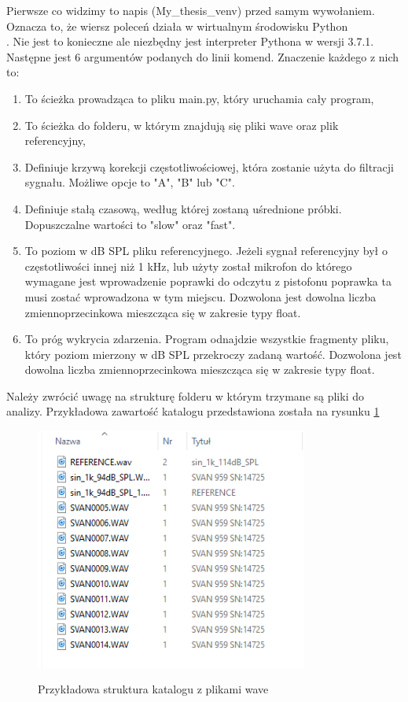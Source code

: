 \documentclass[eng,printmode]{mgr}
\begin{document}
Pierwsze co widzimy to napis (My\_thesis\_venv) przed samym wywołaniem. Oznacza to, że wiersz poleceń działa w wirtualnym środowisku Python \\ \cite{venv}. Nie jest to konieczne ale niezbędny jest interpreter Pythona w wersji 3.7.1. Następne jest 6 argumentów podanych do linii komend. Znaczenie każdego z nich to:

\begin{minipage}{\linewidth}
\begin{enumerate}
\item To ścieżka prowadząca to pliku main.py, który uruchamia cały program,
\item To ścieżka do folderu, w którym znajdują się pliki wave oraz plik referencyjny,
\item Definiuje krzywą korekcji częstotliwościowej, która zostanie użyta do filtracji sygnału. Możliwe opcje to "A", "B" lub "C".
\item Definiuje stałą czasową, według której zostaną uśrednione próbki. Dopuszczalne wartości to "slow" oraz "fast".
\item To poziom w dB SPL pliku referencyjnego. Jeżeli sygnał referencyjny był o częstotliwości innej niż 1 kHz, lub użyty został mikrofon do którego wymagane jest wprowadzenie poprawki do odczytu z pistofonu poprawka ta musi zostać wprowadzona w tym miejscu. Dozwolona jest dowolna liczba zmiennoprzecinkowa mieszcząca się w zakresie typy float.
\item To próg wykrycia zdarzenia. Program odnajdzie wszystkie fragmenty pliku, który poziom mierzony w dB SPL przekroczy zadaną wartość. Dozwolona jest dowolna liczba zmiennoprzecinkowa mieszcząca się w zakresie typy float.
\end{enumerate}
\end{minipage}   

Należy zwrócić uwagę na strukturę folderu w którym trzymane są pliki do analizy. Przykładowa zawartość katalogu przedstawiona została na rysunku \ref{katalog}

\begin{figure}[hbtp]
\caption{Przykładowa struktura katalogu z plikami wave}
\centering
\includegraphics[width=0.8\textwidth]{katalog_przyklad.PNG}
\label{katalog}
\end{figure}
\end{document}
